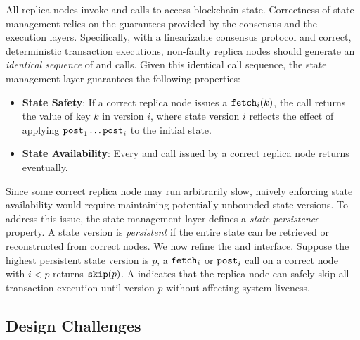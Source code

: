 All replica nodes invoke \fetch and \bump calls to access blockchain state.
Correctness of state management relies on the guarantees provided by the consensus and the execution layers.
Specifically, with a linearizable consensus protocol and correct, deterministic transaction executions, non-faulty replica nodes should generate an \emph{identical sequence} of \fetch and \bump calls.
Given this identical call sequence, the state management layer guarantees the following properties:

\begin{itemize}
    \item \textbf{State Safety}: If a correct replica node issues a $\texttt{fetch}_{i}(k)$, the call returns the value of key $k$ in version $i$, where state version $i$ reflects the effect of applying $\texttt{post}_{1} \dots \texttt{post}_{i}$ to the initial state.

    \item \textbf{State Availability}: Every \fetch and \bump call issued by a correct replica node returns eventually. 
\end{itemize}

Since some correct replica node may run arbitrarily slow, naively enforcing state availability would require maintaining potentially unbounded state versions.
To address this issue, the state management layer defines a \emph{state persistence} property.
A state version is \emph{persistent} if the entire state can be retrieved or reconstructed from correct nodes.
We now refine the \fetch and \bump interface.
Suppose the highest persistent state version is $p$, a $\texttt{fetch}_{i}$ or $\texttt{post}_{i}$ call on a correct node with $i < p$ returns $\texttt{skip}(p)$.
A \forward indicates that the replica node can safely skip all transaction execution until version $p$ without affecting system liveness.



\subsection{Design Challenges}
\label{sec:arch:challenges}

